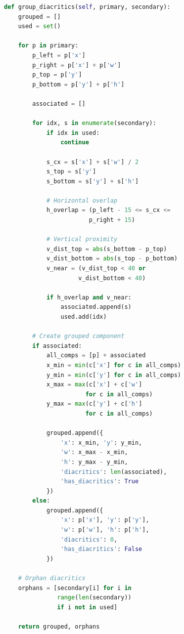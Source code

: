 \documentclass[12pt,a4paper,oneside]{report}
\begin{document}
\begin{lstlisting}[language=Python, caption=Diacritic Grouping Implementation]
def group_diacritics(self, primary, secondary):
    grouped = []
    used = set()
    
    for p in primary:
        p_left = p['x']
        p_right = p['x'] + p['w']
        p_top = p['y']
        p_bottom = p['y'] + p['h']
        
        associated = []
        
        for idx, s in enumerate(secondary):
            if idx in used:
                continue
            
            s_cx = s['x'] + s['w'] / 2
            s_top = s['y']
            s_bottom = s['y'] + s['h']
            
            # Horizontal overlap
            h_overlap = (p_left - 15 <= s_cx <= 
                        p_right + 15)
            
            # Vertical proximity
            v_dist_top = abs(s_bottom - p_top)
            v_dist_bottom = abs(s_top - p_bottom)
            v_near = (v_dist_top < 40 or 
                     v_dist_bottom < 40)
            
            if h_overlap and v_near:
                associated.append(s)
                used.add(idx)
        
        # Create grouped component
        if associated:
            all_comps = [p] + associated
            x_min = min(c['x'] for c in all_comps)
            y_min = min(c['y'] for c in all_comps)
            x_max = max(c['x'] + c['w'] 
                       for c in all_comps)
            y_max = max(c['y'] + c['h'] 
                       for c in all_comps)
            
            grouped.append({
                'x': x_min, 'y': y_min,
                'w': x_max - x_min,
                'h': y_max - y_min,
                'diacritics': len(associated),
                'has_diacritics': True
            })
        else:
            grouped.append({
                'x': p['x'], 'y': p['y'],
                'w': p['w'], 'h': p['h'],
                'diacritics': 0,
                'has_diacritics': False
            })
    
    # Orphan diacritics
    orphans = [secondary[i] for i in 
               range(len(secondary)) 
               if i not in used]
    
    return grouped, orphans
\end{lstlisting}
\end{document}
